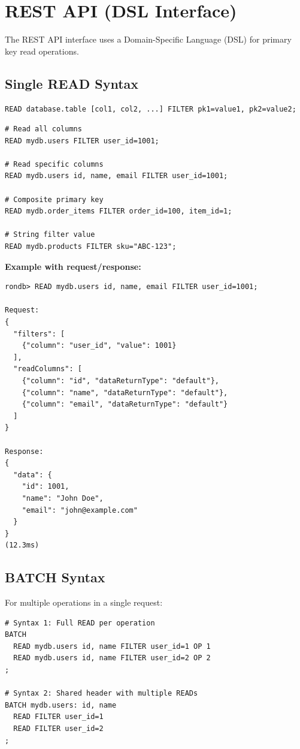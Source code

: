 \documentclass[11pt,a4paper]{report}
\begin{document}
\section{REST API (DSL Interface)}

The REST API interface uses a Domain-Specific Language (DSL) for primary key read operations.

\subsection{Single READ Syntax}

\begin{lstlisting}[language=rondb]
READ database.table [col1, col2, ...] FILTER pk1=value1, pk2=value2;
\end{lstlisting}

\begin{lstlisting}[language=rondb]
# Read all columns
READ mydb.users FILTER user_id=1001;

# Read specific columns
READ mydb.users id, name, email FILTER user_id=1001;

# Composite primary key
READ mydb.order_items FILTER order_id=100, item_id=1;

# String filter value
READ mydb.products FILTER sku="ABC-123";
\end{lstlisting}

\textbf{Example with request/response:}
\begin{lstlisting}[language=rondb]
rondb> READ mydb.users id, name, email FILTER user_id=1001;

Request:
{
  "filters": [
    {"column": "user_id", "value": 1001}
  ],
  "readColumns": [
    {"column": "id", "dataReturnType": "default"},
    {"column": "name", "dataReturnType": "default"},
    {"column": "email", "dataReturnType": "default"}
  ]
}

Response:
{
  "data": {
    "id": 1001,
    "name": "John Doe",
    "email": "john@example.com"
  }
}
(12.3ms)
\end{lstlisting}

\subsection{BATCH Syntax}

For multiple operations in a single request:

\begin{lstlisting}[language=rondb]
# Syntax 1: Full READ per operation
BATCH
  READ mydb.users id, name FILTER user_id=1 OP 1
  READ mydb.users id, name FILTER user_id=2 OP 2
;

# Syntax 2: Shared header with multiple READs
BATCH mydb.users: id, name
  READ FILTER user_id=1
  READ FILTER user_id=2
;
\end{lstlisting}
\end{document}
